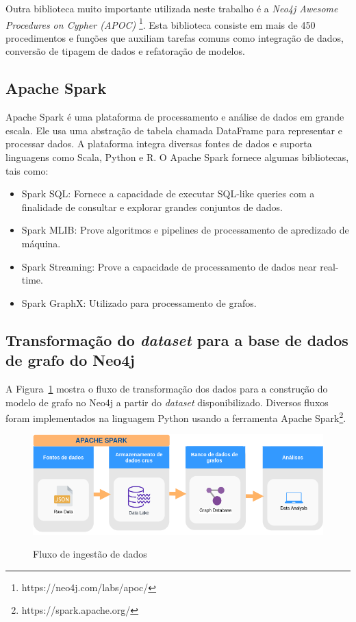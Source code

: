 Outra biblioteca muito importante utilizada neste trabalho é a \emph{Neo4j Awesome Procedures on
Cypher (APOC)} \footnote{https://neo4j.com/labs/apoc/}. Esta biblioteca consiste em mais de 450 procedimentos e funções que auxiliam tarefas comuns como integração de dados, conversão de tipagem de dados e refatoração de modelos.


\subsection{Apache Spark}


Apache Spark é uma plataforma de processamento e análise de dados em grande escala. 
Ele usa uma abstração de tabela chamada DataFrame para representar e processar dados.
A plataforma integra diversas fontes de dados e suporta linguagens como Scala, Python e R. O Apache Spark fornece algumas bibliotecas, tais como:

\begin{itemize}
    \item Spark SQL: Fornece a capacidade de executar SQL-like queries com a finalidade de consultar e explorar grandes conjuntos de dados.
    
    \item Spark MLIB: Prove algoritmos e pipelines de processamento de apredizado de máquina.
    
    \item Spark Streaming: Prove a capacidade de processamento de dados near real-time.
    
    \item Spark GraphX: Utilizado para processamento de grafos. 
    
\end{itemize}

\subsection{Transformação do \emph{dataset} para a base de dados de grafo do Neo4j}
\label{subsec:work}

A Figura~\ref{fig:workflow} mostra o fluxo de transformação dos dados para a construção do modelo de grafo no Neo4j a partir do \emph{dataset} disponibilizado. Diversos fluxos foram implementados na linguagem Python usando a ferramenta Apache Spark\footnote{https://spark.apache.org/}. 


 \begin{figure}[!h]
 \caption{Fluxo de ingestão de dados}
     \centering
     \includegraphics[scale=.45]{./Capitulo3/img/data-flow.png}
         \label{fig:workflow}
 \end{figure}
 
